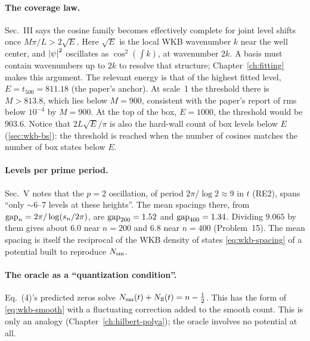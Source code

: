 \paragraph{The coverage law.} Sec.~III says the cosine family becomes effectively complete for joint level shifts once $M\pi/L>2\sqrt E$. Here $\sqrt E$ is the local WKB wavenumber $k$ near the well center, and $\left\lvert \psi\right\rvert^2$ oscillates as $\cos^2(\int k)$, at wavenumber $2k$. A basis must contain wavenumbers up to $2k$ to resolve that structure; Chapter~\ref{ch:fitting} makes this argument. The relevant energy is that of the highest fitted level, $E=t_{500}=811.18$ (the paper's anchor). At scale~1 the threshold there is $M>813.8$, which lies below $M=900$, consistent with the paper's report of rms below $10^{-4}$ by $M=900$. At the top of the box, $E=1000$, the threshold would be $903.6$. Notice that $2L\sqrt E/\pi$ is also the hard-wall count of box levels below $E$ (\cref{sec:wkb-bs}): the threshold is reached when the number of cosines matches the number of box states below $E$.

\paragraph{Levels per prime period.} Sec.~V notes that the $p=2$ oscillation, of period $2\pi/\log2\approx9$ in $t$ (RE2), spans ``only $\sim$6--7 levels at these heights''. The mean spacings there, from $\mathrm{gap}_n=2\pi/\log(s_n/2\pi)$, are $\mathrm{gap}_{200}=1.52$ and $\mathrm{gap}_{400}=1.34$. Dividing $9.065$ by them gives about $6.0$ near $n=200$ and $6.8$ near $n=400$ (Problem~15). The mean spacing is itself the reciprocal of the WKB density of states \cref{eq:wkb-spacing} of a potential built to reproduce $N_{\mathrm{sm}}$.

\paragraph{The oracle as a ``quantization condition''.} Eq.~(4)'s predicted zeros solve $N_{\mathrm{sm}}(t)+N_{\mathrm{fl}}(t)=n-\frac12$. This has the form of \cref{eq:wkb-smooth} with a fluctuating correction added to the smooth count. This is only an analogy (Chapter~\ref{ch:hilbert-polya}); the oracle involves no potential at all.


